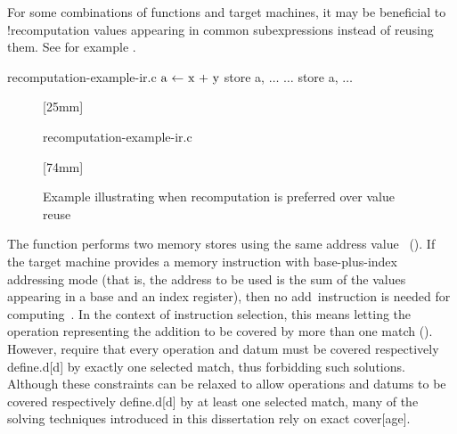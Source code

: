 For some combinations of \glspl{function} and \glspl{target machine}, it may be
beneficial to \glsshort!{recomputation} values appearing in common
subexpressions instead of reusing them.
%
See for example .
%
\begin{filecontents*}{recomputation-example-ir.c}
$\irAssign{a}{x + y}$
store a, $\ldots$
$\ldots$
store a, $\ldots$
\end{filecontents*}
%
\begin{figure}
  \centering%
  \mbox{}%
  \hfill%
                [25mm]%
                {%
                  \begin{lstpage}{22mm}%
                                    {recomputation-example-ir.c}%
                  \end{lstpage}%
                }%
  \hfill%
                [74mm]%
                {%
                }%
  \hfill%
  \mbox{}

  \caption{%
    Example illustrating when recomputation is preferred over value reuse%
  }%
\end{figure}
%
The \gls{function} performs two memory stores using the same address
value~ ().
%
If the \gls{target machine} provides a memory \gls{instruction} with
base-plus-index \gls{addressing mode} (that is, the address to be used is the
sum of the values appearing in a base and an index \gls{register}), then no
add~\gls{instruction} is needed for computing~.
%
In the context of \gls{instruction selection}, this means letting the
\gls{operation} representing the addition to be covered by more than one
\gls{match} ().
%
However,  require that
every \gls{operation} and \gls{datum} must be covered respectively
\gls{define.d}[d] by exactly one selected \gls{match}, thus forbidding such
\glspl{solution}.
%
Although these \glspl{constraint} can be relaxed to allow \glspl{operation} and
\glspl{datum} to be covered respectively \gls{define.d}[d] by at least one
selected \gls{match}, many of the solving techniques introduced in this
dissertation rely on exact \gls{cover}[age].


